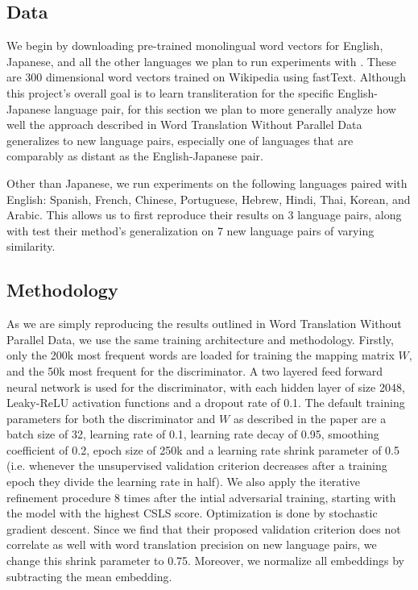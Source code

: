 \documentclass{article}
\begin{document}
\subsection*{Data}

We begin by downloading pre-trained monolingual word vectors for English, Japanese,
and all the other languages we plan to run experiments with \cite{bojanowski2017enriching}.
These are 300 dimensional word vectors trained on Wikipedia using fastText.
Although this project's overall goal is to learn transliteration for the specific
English-Japanese language pair, for this section we plan to more generally analyze
how well the approach described in Word Translation Without Parallel Data generalizes
to new language pairs, especially one of languages that are comparably as distant as
the English-Japanese pair.

Other than Japanese, we run experiments on the following languages paired with English:
Spanish, French, Chinese, Portuguese, Hebrew, Hindi, Thai, Korean, and Arabic. This
allows us to first reproduce their results on 3 language pairs, along with test their
method's generalization on 7 new language pairs of varying similarity.

\subsection*{Methodology}

As we are simply reproducing the results outlined in Word Translation Without Parallel
Data, we use the same training architecture and methodology. Firstly, only the 200k
most frequent words are loaded for training the mapping matrix $W$, and the 50k most
frequent for the discriminator. A two layered feed forward neural network is used
for the discriminator, with each hidden layer of size 2048, Leaky-ReLU activation
functions and a dropout rate of 0.1. The default training parameters for
both the discriminator and $W$ as described in the paper are a
batch size of 32, learning rate of 0.1, learning rate decay of 0.95, smoothing
coefficient of 0.2, epoch size of 250k and a learning rate shrink parameter of 0.5
(i.e. whenever the unsupervised validation criterion decreases after a training epoch
they divide the learning rate in half). We also apply the iterative refinement
procedure 8 times after the intial adversarial training, starting with the model with
the highest CSLS score. Optimization is done by stochastic gradient descent.
Since we find that their proposed validation
criterion does not correlate as well with word translation precision on new language
pairs, we change this shrink parameter to 0.75. Moreover, we normalize all embeddings
by subtracting the mean embedding.
\end{document}
